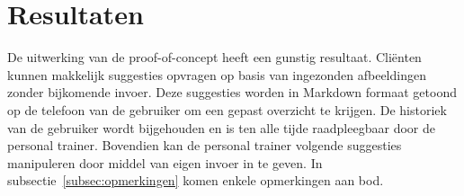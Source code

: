 \section{Resultaten}
\label{sec:resultaten}
De uitwerking van de proof-of-concept heeft een gunstig resultaat.
Cliënten kunnen makkelijk suggesties opvragen op basis van ingezonden afbeeldingen zonder bijkomende invoer.
Deze suggesties worden in Markdown formaat getoond op de telefoon van de gebruiker om een gepast overzicht te krijgen.
De historiek van de gebruiker wordt bijgehouden en is ten alle tijde raadpleegbaar door de personal trainer.
Bovendien kan de personal trainer volgende suggesties manipuleren door middel van eigen invoer in te geven.
In subsectie~\ref{subsec:opmerkingen} komen enkele opmerkingen aan bod.